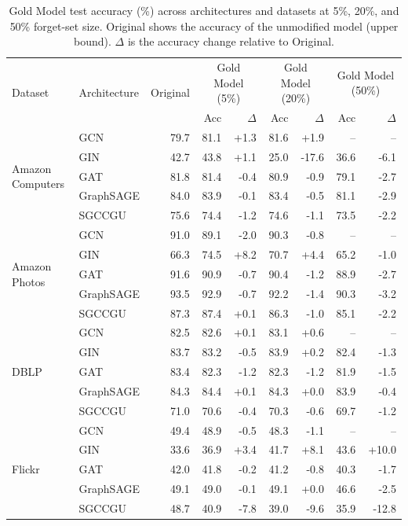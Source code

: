 \begin{table}[t]
\centering
\caption{Gold Model test accuracy (\%) across architectures and datasets
         at 5\%, 20\%, and 50\% forget-set size.
         Original shows the accuracy of the unmodified model (upper bound).
         $\Delta$ is the accuracy change relative to Original.}
\label{tab:goldmodel_accuracy}
\small
\setlength{\tabcolsep}{5pt}
\begin{tabular}{@{}ll r rr rr rr@{}}
\toprule
\multirow{2}{*}{Dataset} & \multirow{2}{*}{Architecture} & \multirow{2}{*}{Original} & \multicolumn{2}{c}{Gold Model (5\%)} & \multicolumn{2}{c}{Gold Model (20\%)} & \multicolumn{2}{c}{Gold Model (50\%)} \\
\cmidrule(lr){4-5}\cmidrule(lr){6-7}\cmidrule(lr){8-9}
 & & & Acc & $\Delta$ & Acc & $\Delta$ & Acc & $\Delta$ \\
\midrule
\multirow{5}{*}{Amazon Computers} & GCN & 79.7 & 81.1 & +1.3 & 81.6 & +1.9 & -- & -- \\
 & GIN & 42.7 & 43.8 & +1.1 & 25.0 & -17.6 & 36.6 & -6.1 \\
 & GAT & 81.8 & 81.4 & -0.4 & 80.9 & -0.9 & 79.1 & -2.7 \\
 & GraphSAGE & 84.0 & 83.9 & -0.1 & 83.4 & -0.5 & 81.1 & -2.9 \\
 & SGCCGU & 75.6 & 74.4 & -1.2 & 74.6 & -1.1 & 73.5 & -2.2 \\
\midrule
\multirow{5}{*}{Amazon Photos} & GCN & 91.0 & 89.1 & -2.0 & 90.3 & -0.8 & -- & -- \\
 & GIN & 66.3 & 74.5 & +8.2 & 70.7 & +4.4 & 65.2 & -1.0 \\
 & GAT & 91.6 & 90.9 & -0.7 & 90.4 & -1.2 & 88.9 & -2.7 \\
 & GraphSAGE & 93.5 & 92.9 & -0.7 & 92.2 & -1.4 & 90.3 & -3.2 \\
 & SGCCGU & 87.3 & 87.4 & +0.1 & 86.3 & -1.0 & 85.1 & -2.2 \\
\midrule
\multirow{5}{*}{DBLP} & GCN & 82.5 & 82.6 & +0.1 & 83.1 & +0.6 & -- & -- \\
 & GIN & 83.7 & 83.2 & -0.5 & 83.9 & +0.2 & 82.4 & -1.3 \\
 & GAT & 83.4 & 82.3 & -1.2 & 82.3 & -1.2 & 81.9 & -1.5 \\
 & GraphSAGE & 84.3 & 84.4 & +0.1 & 84.3 & +0.0 & 83.9 & -0.4 \\
 & SGCCGU & 71.0 & 70.6 & -0.4 & 70.3 & -0.6 & 69.7 & -1.2 \\
\midrule
\multirow{5}{*}{Flickr} & GCN & 49.4 & 48.9 & -0.5 & 48.3 & -1.1 & -- & -- \\
 & GIN & 33.6 & 36.9 & +3.4 & 41.7 & +8.1 & 43.6 & +10.0 \\
 & GAT & 42.0 & 41.8 & -0.2 & 41.2 & -0.8 & 40.3 & -1.7 \\
 & GraphSAGE & 49.1 & 49.0 & -0.1 & 49.1 & +0.0 & 46.6 & -2.5 \\
 & SGCCGU & 48.7 & 40.9 & -7.8 & 39.0 & -9.6 & 35.9 & -12.8 \\
\bottomrule
\end{tabular}
\end{table}
